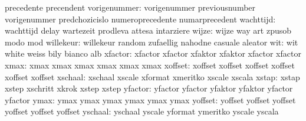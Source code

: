                            precedente                precendent
             vorigenummer: vorigenummer              previousnumber
                           vorigenummer              predchozicislo
                           numeroprecedente          numarprecedent
                wachttijd: wachttijd                 delay
                           wartezeit                 prodleva
                           attesa                    intarziere
                    wijze: wijze                     way
                           art                       zpusob
                           modo                      mod
                willekeur: willekeur                 random
                           zufaellig                 nahodne
                           casuale                   aleator
                      wit: wit                       white
                           weiss                     bily
                           bianco                    alb
                  xfactor: xfactor                   xfactor
                           xfaktor                   xfaktor
                           xfactor                   xfactor %
                     xmax: xmax                      xmax
                           xmax                      xmax
                           xmax                      xmax %
                  xoffset: xoffset                   xoffset
                           xoffset                   xoffset
                           xoffset                   xoffset %
                  xschaal: xschaal                   xscale
                           xformat                   xmeritko
                           xscale                    xscala %
                    xstap: xstap                     xstep
                           xschritt                  xkrok
                           xstep                     xstep %
                  yfactor: yfactor                   yfactor
                           yfaktor                   yfaktor
                           yfactor                   yfactor %
                     ymax: ymax                      ymax
                           ymax                      ymax
                           ymax                      ymax %
                  yoffset: yoffset                   yoffset
                           yoffset                   yoffset
                           yoffset                   yoffset %
                  yschaal: yschaal                   yscale
                           yformat                   ymeritko
                           yscale                    yscala %
